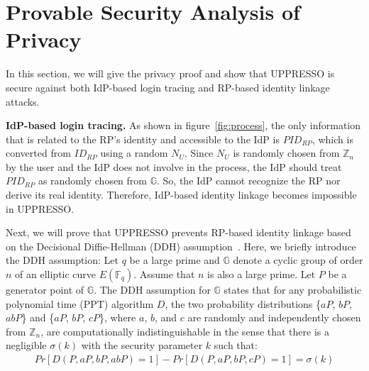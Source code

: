 \section{Provable Security Analysis of Privacy}
\label{sec:privacy}


In this section, we will give the privacy proof and show that UPPRESSO is secure against both IdP-based login tracing and RP-based identity linkage attacks.

\noindent\textbf{IdP-based login tracing.} 
As shown in figure~\ref{fig:process}, the only information that is related to the RP's identity and accessible to the IdP is $PID_{RP}$, which is converted from $ID_{RP}$ using a random $N_U$. Since $N_U$ is randomly chosen from $\mathbb{Z}_n$ by the user and the IdP does not involve in the process, the IdP should treat $PID_{RP}$ as randomly chosen from $\mathbb{G}$. So, the IdP cannot recognize the RP nor derive its real identity. Therefore, IdP-based identity linkage becomes impossible in UPPRESSO.

Next, we will prove that UPPRESSO prevents RP-based identity linkage based on the Decisional Diffie-Hellman (DDH) assumption~\cite{GoldwasserK16}. Here, we briefly introduce the DDH assumption: 
Let $q$ be a large prime and $\mathbb{G}$ denote a  cyclic group of order $n$ of an elliptic curve $E(\mathbb{F}_q)$. 
Assume that $n$ is also a large prime. Let $P$ be a generator point of $\mathbb{G}$. The DDH assumption for $\mathbb{G}$ states that for any probabilistic polynomial time (PPT) algorithm $D$, the two probability distributions \{$aP$, $bP$, $abP$\} and \{$aP$, $bP$, $cP$\}, where $a$, $b$, and $c$ are randomly and independently chosen from $\mathbb{Z}_n$, are computationally indistinguishable in the sense that there is a negligible $\sigma(k)$ with the security parameter $k$ such that:
\vspace{-\topsep}
\begin{multline*}
Pr[D(P, aP, bP, abP)=1]-Pr[D(P, aP, bP, cP)=1]=\sigma(k)
\end{multline*}
\vspace{-\topsep}


